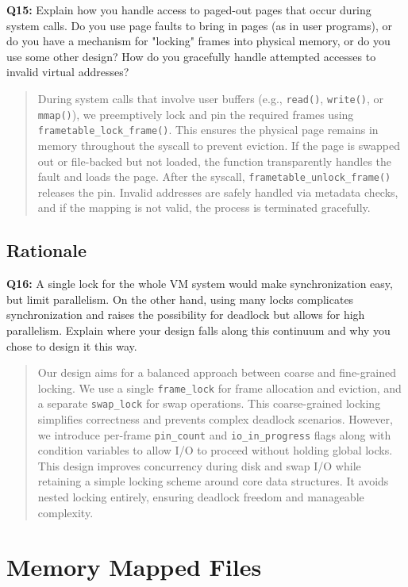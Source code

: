 \documentclass[a4paper,11pt]{paper}
\begin{document}
\textbf{Q15:} Explain how you handle access to paged-out pages that occur during system calls.  Do you use page faults to bring in pages (as in user programs), or do you have a mechanism for "locking" frames into physical memory, or do you use some other design?  How do you gracefully handle attempted accesses to invalid virtual addresses?
\begin{quote}
During system calls that involve user buffers (e.g., \texttt{read()}, \texttt{write()}, or \texttt{mmap()}), we preemptively lock and pin the required frames using \texttt{frametable\_lock\_frame()}. This ensures the physical page remains in memory throughout the syscall to prevent eviction. If the page is swapped out or file-backed but not loaded, the function transparently handles the fault and loads the page. After the syscall, \texttt{frametable\_unlock\_frame()} releases the pin. Invalid addresses are safely handled via metadata checks, and if the mapping is not valid, the process is terminated gracefully.
\end{quote}


\subsection{Rationale}

\textbf{Q16:} A single lock for the whole VM system would make synchronization easy, but limit parallelism.  On the other hand, using many locks complicates synchronization and raises the possibility for deadlock but allows for high parallelism.  Explain where your design falls along this continuum and why you chose to design it this way.
\begin{quote}
Our design aims for a balanced approach between coarse and fine-grained locking. We use a single \texttt{frame\_lock} for frame allocation and eviction, and a separate \texttt{swap\_lock} for swap operations. This coarse-grained locking simplifies correctness and prevents complex deadlock scenarios. However, we introduce per-frame \texttt{pin\_count} and \texttt{io\_in\_progress} flags along with condition variables to allow I/O to proceed without holding global locks. This design improves concurrency during disk and swap I/O while retaining a simple locking scheme around core data structures. It avoids nested locking entirely, ensuring deadlock freedom and manageable complexity.
\end{quote}



\section{Memory Mapped Files}
\end{document}

